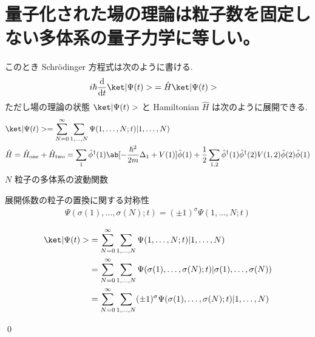 \documentclass[uplatex,dvipdfmx,a4paper,11pt]{jlreq}
\makeatletter
\numberwithin{equation}{section}
\theoremstyle{definition}
\renewenvironment{proof}[1][\proofname]{\par
  \normalfont
  \topsep6\p@\@plus6\p@ \trivlist
  \item[\hskip\labelsep{\bfseries #1}\@addpunct{\bfseries}]\ignorespaces\quad\par
}{
  \qed\endtrivlist\@endpefalse
}
\renewcommand\proofname{証明}
\makeatother
\begin{document}
\section{量子化された場の理論は粒子数を固定しない多体系の量子力学に等しい。}
\begin{definition}[場の理論]
  このとき Schrödinger 方程式は次のように書ける.
  \begin{align}
    i\hbar\diff{}{t}\ket|\Psi(t)> & = \hat{H}\ket|\Psi(t)>
  \end{align}
  ただし場の理論の状態 $\ket|\Psi(t)>$ と Hamiltonian $\hat{H}$ は次のように展開できる.
  \begin{align}
     & \ket|\Psi(t)> = \sum_{N=0}^{\infty}\sum_{1,\ldots,N}\Psi(1,\ldots,N; t)|1,\ldots,N)                                                                                                                                                                \\
     & \hat{H} = \hat{H}_{\mathrm{one}} + \hat{H}_{\mathrm{two}} = \sum_{1}\hat{\phi}^\dagger(1)\ab[-\frac{\hbar^2}{2m}\Delta_{1} + V(1)]\hat{\phi}(1) + \frac{1}{2}\sum_{1,2}\hat{\phi}^\dagger(1)\hat{\phi}^\dagger(2)V(1, 2)\hat{\phi}(2)\hat{\phi}(1)
  \end{align}
  $N$ 粒子の多体系の波動関数
\end{definition}
\begin{theorem}[Q21-93]
  展開係数の粒子の置換に関する対称性
  \begin{align}
    \Psi(\sigma(1),\ldots,\sigma(N);t) = (\pm 1)^\sigma\Psi(1,\ldots,N; t)
  \end{align}
\end{theorem}
\begin{proof}
  \begin{align}
    \ket|\Psi(t)> & = \sum_{N=0}^{\infty}\sum_{1,\ldots,N}\Psi(1,\ldots,N; t)|1,\ldots,N)                                 \\
                  & = \sum_{N=0}^{\infty}\sum_{1,\ldots,N}\Psi(\sigma(1),\ldots,\sigma(N); t)|\sigma(1),\ldots,\sigma(N)) \\
                  & = \sum_{N=0}^{\infty}\sum_{1,\ldots,N}(\pm 1)^\sigma\Psi(\sigma(1),\ldots,\sigma(N); t)|1,\ldots,N)
  \end{align}
\end{proof}
\end{document}
